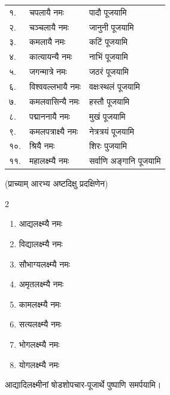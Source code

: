 \begin{longtable}{ll@{— }l}
१.& चपलायै नमः & पादौ पूजयामि\\
२.& चञ्चलायै नमः & जानुनी पूजयामि\\
३.& कमलायै नमः & कटिं पूजयामि\\
४.& कात्यायन्यै नमः & नाभिं पूजयामि\\
५.& जगन्मात्रे नमः & जठरं पूजयामि\\
६.& विश्ववल्लभायै नमः & वक्षःस्थलं पूजयामि\\
७.& कमलवासिन्यै नमः & हस्तौ पूजयामि\\
८.& पद्माननायै नमः & मुखं पूजयामि\\
९.& कमलपत्राक्ष्यै नमः & नेत्रत्रयं पूजयामि\\
१०.& श्रियै नमः & शिरः पुजयामि\\
११.& महालक्ष्म्यै नमः & सर्वाणि अङ्गानि पूजयामि\\
\end{longtable}

(प्राच्याम् आरभ्य अष्टदिक्षु प्रदक्षिणेन)

\begin{multicols}{2}
\begin{enumerate}
\item आद्यलक्ष्म्यै नमः
\item विद्यालक्ष्म्यै नमः
\item सौभाग्यलक्ष्म्यै नमः
\item अमृतलक्ष्म्यै नमः
\item कामलक्ष्म्यै नमः
\item सत्यलक्ष्म्यै नमः
\item भोगलक्ष्म्यै नमः
\item योगलक्ष्म्यै नमः
\end{enumerate}
\end{multicols}

आद्यादिलक्ष्मीनां षोडशोपचार-पूजार्थे पुष्पाणि समर्पयामि।

\begingroup
\setlength{\columnseprule}{1pt}
\let\chapt\sect

\endgroup


